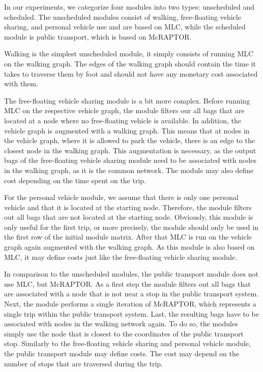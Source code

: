 In our experiments, we categorize four modules into two types: unscheduled and scheduled. 
The unscheduled modules consist of walking, free-floating vehicle sharing, and personal vehicle use and are based on MLC, while the scheduled module is public transport, which is based on McRAPTOR.

Walking is the simplest unscheduled module, it simply consists of running MLC on the walking graph.
The edges of the walking graph should contain the time it takes to traverse them by foot and should not have any monetary cost associated with them.

The free-floating vehicle sharing module is a bit more complex.
Before running MLC on the respective vehicle graph, the module filters our all bags that are located at a node where no free-floating vehicle is available.
In addition, the vehicle graph is augmented with a walking graph. 
This means that at nodes in the vehicle graph, where it is allowed to park the vehicle, there is an edge to the closest node in the walking graph.
This augmentation is necessary, as the output bags of the free-floating vehicle sharing module need to be associated with nodes in the walking graph, as it is the common network.
The module may also define cost depending on the time spent on the trip.

For the personal vehicle module, we assume that there is only one personal vehicle and that it is located at the starting node.
Therefore, the module filters out all bags that are not located at the starting node.
Obviously, this module is only useful for the first trip, or more precisely, the module should only be used in the first row of the initial module matrix.
After that MLC is run on the vehicle graph again augmented with the walking graph.
As this module is also based on MLC, it may define costs just like the free-floating vehicle sharing module.

In comparison to the unscheduled modules, the public transport module does not use MLC, but McRAPTOR.
As a first step the module filters out all bags that are associated with a node that is not near a stop in the public transport system.
Next, the module performs a single iteration of McRAPTOR, which represents a single trip within the public transport system.
Last, the resulting bags have to be associated with nodes in the walking network again.
To do so, the modules simply use the node that is closest to the coordinates of the public transport stop.
Similarly to the free-floating vehicle sharing and personal vehicle module, the public transport module may define costs.
The cost may depend on the number of stops that are traversed during the trip.

